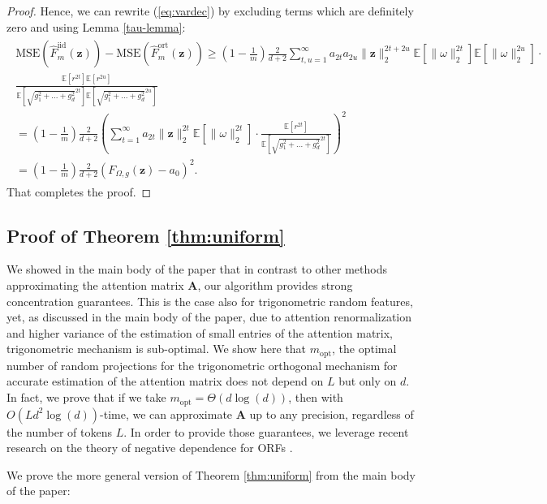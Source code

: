 \begin{proof}
Hence, we can rewrite (\ref{eq:vardec}) by excluding terms which are definitely zero and using Lemma \ref{tau-lemma}:
\begin{align}
\begin{split}
 \mathrm{MSE}(\widehat{F}^{\mathrm{iid}}_{m}(\mathbf{z})) - \mathrm{MSE}(\widehat{F}^{\mathrm{ort}}_{m}(\mathbf{z})) \geq (1-\frac{1}{m})\frac{2}{d+2}\sum_{t,u=1}^{\infty}a_{2 t}a_{2 u}\|\mathbf{z}\|_{2}^{2 t+2u}
 \mathbb{E}[\|\omega\|_{2}^{2 t}] \mathbb{E}[\|\omega\|_{2}^{2 u}] \cdot \\
\frac{\mathbb{E}[r^{2 t}]\mathbb{E}[r^{2 u}]}
{\mathbb{E}[\sqrt{g_{1}^{2}+...+g_{d}^{2}}^{2 t}]
\mathbb{E}[\sqrt{g_{1}^{2}+...+g_{d}^{2}}^{2 u}]}\\
= (1-\frac{1}{m})\frac{2}{d+2}   
\left(\sum_{t=1}^{\infty}a_{2 t}\|\mathbf{z}\|_{2}^{2 t}
 \mathbb{E}[\|\omega\|_{2}^{2 t}] \cdot 
\frac{\mathbb{E}[r^{2 t}]}
{\mathbb{E}[\sqrt{g_{1}^{2}+...+g_{d}^{2}}^{2 t}]}\right)^{2} \\
= (1-\frac{1}{m})\frac{2}{d+2}\left(F_{\Omega,g}(\mathbf{z}) - a_0\right)^2.
\end{split}    
\end{align}
That completes the proof.
\end{proof}

\subsection{Proof of Theorem \ref{thm:uniform}}

We showed in the main body of the paper that in contrast to other methods approximating the attention matrix $\mathbf{A}$, our algorithm provides strong concentration guarantees. This is the case also for trigonometric random features, yet, as discussed in the main body of the paper, due to attention renormalization and higher variance of the estimation of small entries of the attention matrix, trigonometric mechanism is sub-optimal.
We show here that $m_{\mathrm{opt}}$, the optimal number of random projections for the trigonometric orthogonal mechanism for accurate estimation of the attention matrix does not depend on $L$ but only on $d$. In fact, we prove that if we take $m_{\mathrm{opt}} = \Theta(d\log(d))$, then with $O(L d^2\log(d))$-time, we can approximate $\mathbf{A}$ up to any precision, regardless of the number of tokens $L$. In order to provide those guarantees, we leverage recent research on the theory of negative dependence for ORFs \citep{Lin2020DemystifyingOM}.

We prove the more general version of Theorem \ref{thm:uniform} from the main body of the paper: 

